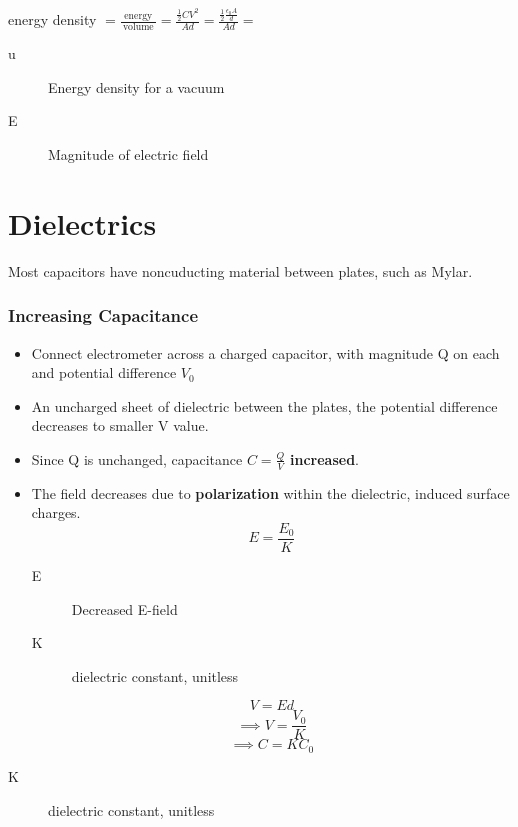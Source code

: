 energy density $= \frac{\:\text{energy}\:}{\:\text{volume}\:} = \frac{\frac{1}{2}CV^2}{Ad} = \frac{\frac{1}{2}\frac{\epsilon_0 A}{d}}{Ad}=$


\begin{description}
	\item[u] Energy density for a vacuum
	\item[E] Magnitude of electric field
\end{description}


\section{Dielectrics}%
\label{sec:dielectrics}

Most capacitors have noncuducting material between plates, such as Mylar.

\subsubsection{Increasing Capacitance}%
\label{ssub:increasing_capacitance}

\begin{itemize}
	\item Connect electrometer across a charged capacitor, with magnitude Q on each and potential
		difference $V_0$
	\item An uncharged sheet of dielectric between the plates, the potential difference decreases
		to smaller V value.
	\item Since Q is unchanged, capacitance $C = \frac{Q}{V}$ \textbf{increased}.
	\item The field decreases due to \textbf{polarization} within the dielectric,
		induced surface charges.
		\[E = \frac{E_0}{K}\]
		\begin{description}
			\item[E] Decreased E-field
		\end{description}
		\begin{description}
			\item[K] dielectric constant, unitless
		\end{description}
		\[V = Ed\]
		\[\implies V = \frac{V_0}{K}\]
		\[\implies C = KC_0\]
\end{itemize}

		\begin{description}
			\item[K] dielectric constant, unitless
		\end{description}


